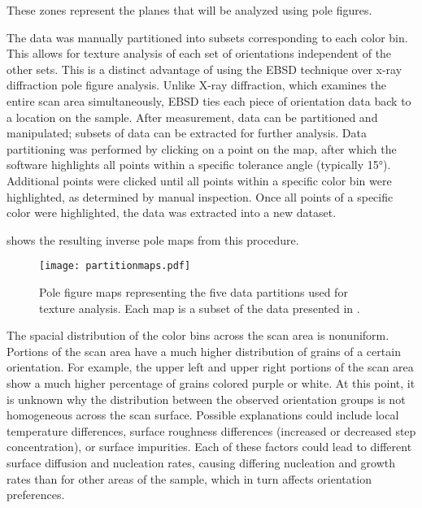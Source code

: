 %	
%
%		
%
%		
%		
%		
%		
%		
These zones represent the planes that will be analyzed using pole figures.

The data was manually partitioned into subsets corresponding to  each color bin. This allows for texture analysis of each set of orientations independent of the other sets. This is a distinct advantage of using the EBSD technique over x-ray diffraction pole figure analysis. Unlike X-ray diffraction, which examines the entire scan area simultaneously,  EBSD ties each piece of orientation data back to a location on the sample. After measurement, data can be partitioned and manipulated; subsets of data can be extracted for further analysis. Data partitioning was performed by clicking on a point on the map, after which the software highlights all points within a specific tolerance angle (typically 15\si{\degree}). Additional points were clicked until all points within a specific color bin were highlighted, as determined by manual inspection. Once all points of a specific color were highlighted, the data was extracted into a new dataset. 

 shows the resulting inverse pole maps from this procedure. 
\begin{figure}
	\texttt{[image: partitionmaps.pdf]}
	\caption[EBSD figure maps for five data partitions]{%
		Pole figure maps representing the five data partitions 
		used for texture analysis. Each map is a subset of the 
		data presented in .}
	\label{fig:partitionmaps}
\end{figure}
The spacial distribution of the color bins across the scan area is nonuniform. Portions of the scan area have a much higher distribution of grains of a certain orientation. For example, the upper left and upper right portions of the scan area show a much higher percentage of grains colored purple or white. At this point, it is unknown why the distribution between the observed orientation groups is not homogeneous across the scan surface. Possible explanations could include local temperature differences, surface roughness differences (increased or decreased step concentration), or surface impurities. Each of these factors could lead to different surface diffusion and nucleation rates, causing differing nucleation and growth rates than for other areas of the sample, which in turn affects orientation preferences.


